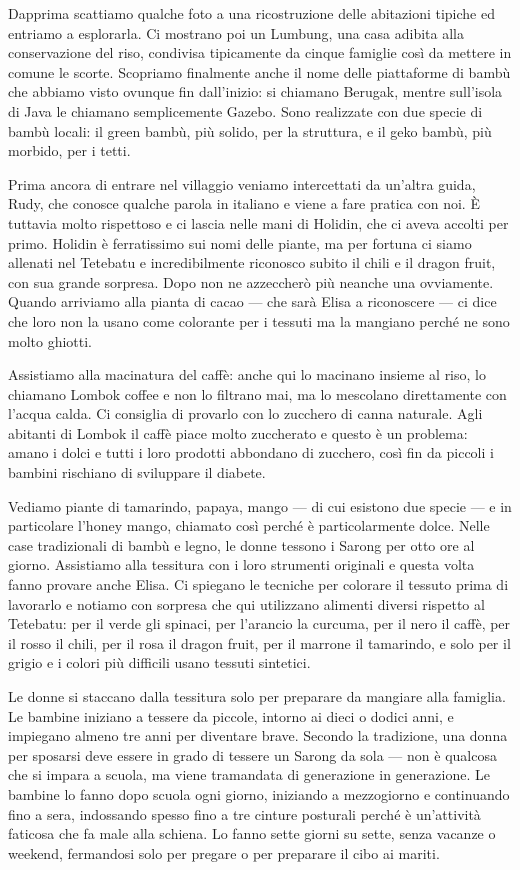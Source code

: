 Dapprima scattiamo qualche foto a una ricostruzione delle abitazioni tipiche ed entriamo a esplorarla. Ci mostrano poi un Lumbung, una casa adibita alla conservazione del riso, condivisa tipicamente da cinque famiglie così da mettere in comune le scorte. Scopriamo finalmente anche il nome delle piattaforme di bambù che abbiamo visto ovunque fin dall'inizio: si chiamano Berugak, mentre sull'isola di Java le chiamano semplicemente Gazebo. Sono realizzate con due specie di bambù locali: il green bambù, più solido, per la struttura, e il geko bambù, più morbido, per i tetti.

Prima ancora di entrare nel villaggio veniamo intercettati da un'altra guida, Rudy, che conosce qualche parola in italiano e viene a fare pratica con noi. È tuttavia molto rispettoso e ci lascia nelle mani di Holidin, che ci aveva accolti per primo. Holidin è ferratissimo sui nomi delle piante, ma per fortuna ci siamo allenati nel Tetebatu e incredibilmente riconosco subito il chili e il dragon fruit, con sua grande sorpresa. Dopo non ne azzeccherò più neanche una ovviamente. Quando arriviamo alla pianta di cacao — che sarà Elisa a riconoscere — ci dice che loro non la usano come colorante per i tessuti ma la mangiano perché ne sono molto ghiotti.

Assistiamo alla macinatura del caffè: anche qui lo macinano insieme al riso, lo chiamano Lombok coffee e non lo filtrano mai, ma lo mescolano direttamente con l'acqua calda. Ci consiglia di provarlo con lo zucchero di canna naturale. Agli abitanti di Lombok il caffè piace molto zuccherato e questo è un problema: amano i dolci e tutti i loro prodotti abbondano di zucchero, così fin da piccoli i bambini rischiano di sviluppare il diabete.

Vediamo piante di tamarindo, papaya, mango — di cui esistono due specie — e in particolare l'honey mango, chiamato così perché è particolarmente dolce. Nelle case tradizionali di bambù e legno, le donne tessono i Sarong per otto ore al giorno. Assistiamo alla tessitura con i loro strumenti originali e questa volta fanno provare anche Elisa. Ci spiegano le tecniche per colorare il tessuto prima di lavorarlo e notiamo con sorpresa che qui utilizzano alimenti diversi rispetto al Tetebatu: per il verde gli spinaci, per l'arancio la curcuma, per il nero il caffè, per il rosso il chili, per il rosa il dragon fruit, per il marrone il tamarindo, e solo per il grigio e i colori più difficili usano tessuti sintetici.

Le donne si staccano dalla tessitura solo per preparare da mangiare alla famiglia. Le bambine iniziano a tessere da piccole, intorno ai dieci o dodici anni, e impiegano almeno tre anni per diventare brave. Secondo la tradizione, una donna per sposarsi deve essere in grado di tessere un Sarong da sola — non è qualcosa che si impara a scuola, ma viene tramandata di generazione in generazione. Le bambine lo fanno dopo scuola ogni giorno, iniziando a mezzogiorno e continuando fino a sera, indossando spesso fino a tre cinture posturali perché è un'attività faticosa che fa male alla schiena. Lo fanno sette giorni su sette, senza vacanze o weekend, fermandosi solo per pregare o per preparare il cibo ai mariti.


